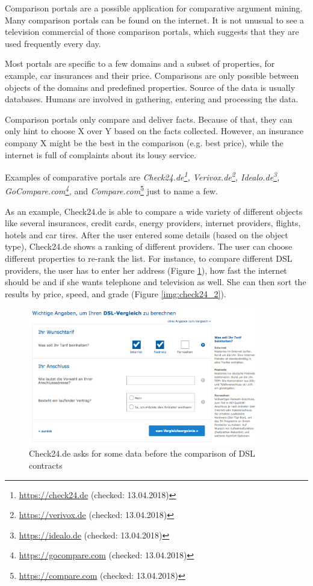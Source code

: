 Comparison portals are a possible application for comparative argument mining. Many comparison portals can be found on the internet. It is not unusual to see a television commercial of those comparison portals, which suggests that they are used frequently every day.

Most portals are specific to a few domains and a subset of properties, for example, car insurances and their price. Comparisons are only possible between objects of the domains and predefined properties. Source of the data is usually databases. Humans are involved in gathering, entering and processing the data.

Comparison portals only compare and deliver facts. Because of that, they can only hint to choose X over Y based on the facts collected.  However, an insurance company X might be the best in the comparison (e.g. best price), while the internet is full of complaints about its lousy service.

Examples of comparative portals are \emph{Check24.de\footnote{\url{https://check24.de} (checked: 13.04.2018)}, Verivox.de\footnote{\url{https://verivox.de} (checked: 13.04.2018)}, Idealo.de\footnote{\url{https://idealo.de} (checked: 13.04.2018)}, GoCompare.com\footnote{\url{https://gocompare.com} (checked: 13.04.2018)},} and \emph{Compare.com}\footnote{\url{https://compare.com} (checked: 13.04.2018)} just to name a few.

As an example, Check24.de is able to compare a wide variety of different objects like several insurances, credit cards, energy providers, internet providers, flights, hotels and car tires. After the user entered some details (based on the object type), Check24.de shows a ranking of different providers. The user can choose different properties to re-rank the list.
For instance, to compare different DSL providers, the user has to enter her address (Figure \ref{img:check24_1}), how fast the internet should be and if she wants telephone and television as well. She can then sort the results by price, speed, and grade (Figure \ref{img:check24_2}).
\begin{figure}[tbp]
 \centering
	\includegraphics[width=0.9\textwidth]{images/ds-sys/check24_1}
	\caption{Check24.de asks for some data before the comparison of DSL contracts}
		\label{img:check24_1}
\end{figure}

